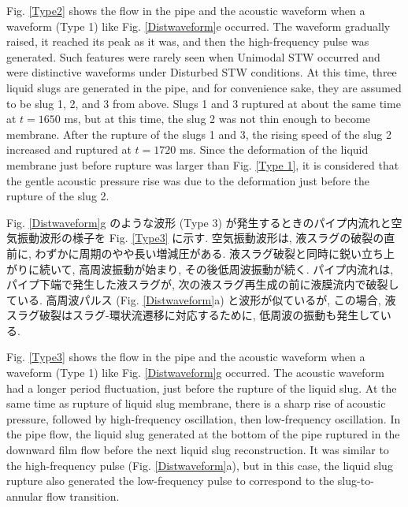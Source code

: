 \documentclass[12pt]{article}
\begin{document}
Fig. \ref{Type2} shows the flow in the pipe and the acoustic waveform when a waveform (Type 1) like Fig. \ref {Distwaveform}e occurred.
The waveform gradually raised, it reached its peak as it was, and then the high-frequency pulse was generated.
Such features were rarely seen when Unimodal STW occurred and were distinctive waveforms under Disturbed STW conditions.
At this time, three liquid slugs are generated in the pipe, and for convenience sake, they are assumed to be slug 1, 2, and 3 from above.
Slugs 1 and 3 ruptured at about the same time at $ t = 1650 $ ms, but at this time, the slug 2 was not thin enough to become membrane.
After the rupture of the slugs 1 and 3, the rising speed of the slug 2 increased and ruptured at $ t = 1720 $ ms.
Since the deformation of the liquid membrane just before rupture was larger than Fig. \ref {Type 1}, it is considered that the gentle acoustic pressure rise was due to the deformation just before the rupture of the slug 2.

Fig. \ref{Distwaveform}g のような波形 (Type 3) が発生するときのパイプ内流れと空気振動波形の様子を Fig. \ref{Type3} に示す. 空気振動波形は, 液スラグの破裂の直前に, わずかに周期のやや長い増減圧がある. 
液スラグ破裂と同時に鋭い立ち上がりに続いて, 高周波振動が始まり, その後低周波振動が続く. 
パイプ内流れは, パイプ下端で発生した液スラグが, 次の液スラグ再生成の前に液膜流内で破裂している. 
高周波パルス (Fig. \ref{Distwaveform}a) と波形が似ているが, この場合, 液スラグ破裂はスラグ-環状流遷移に対応するために, 低周波の振動も発生している.

Fig. \ref{Type3} shows the flow in the pipe and the acoustic waveform when a waveform (Type 1) like Fig. \ref {Distwaveform}g occurred. 
The acoustic waveform had a longer period fluctuation, just before the rupture of the liquid slug.
At the same time as rupture of liquid slug membrane, there is a sharp rise of acoustic pressure, followed by high-frequency oscillation, then low-frequency oscillation. 
In the pipe flow, the liquid slug generated at the bottom of the pipe ruptured in the downward film flow before the next liquid slug reconstruction.
It was similar to the high-frequency pulse (Fig. \ref{Distwaveform}a), but in this case, the liquid slug rupture also generated the low-frequency pulse to correspond to the slug-to-annular flow transition.

\clearpage
\end{document}
